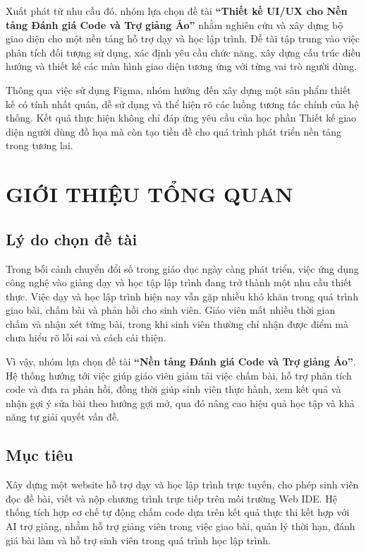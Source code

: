 \documentclass[12pt,a4paper,oneside]{report}
\begin{document}
Xuất phát từ nhu cầu đó, nhóm lựa chọn đề tài \textbf{``Thiết kế UI/UX cho Nền tảng Đánh giá Code và Trợ giảng Ảo''} nhằm nghiên cứu và xây dựng bộ giao diện cho một nền tảng hỗ trợ dạy và học lập trình. Đề tài tập trung vào việc phân tích đối tượng sử dụng, xác định yêu cầu chức năng, xây dựng cấu trúc điều hướng và thiết kế các màn hình giao diện tương ứng với từng vai trò người dùng.

Thông qua việc sử dụng Figma, nhóm hướng đến xây dựng một sản phẩm thiết kế có tính nhất quán, dễ sử dụng và thể hiện rõ các luồng tương tác chính của hệ thống. Kết quả thực hiện không chỉ đáp ứng yêu cầu của học phần Thiết kế giao diện người dùng đồ họa mà còn tạo tiền đề cho quá trình phát triển nền tảng trong tương lai.

\newpage

\chapter{GIỚI THIỆU TỔNG QUAN}

\section{Lý do chọn đề tài}

Trong bối cảnh chuyển đổi số trong giáo dục ngày càng phát triển, việc ứng dụng công nghệ vào giảng dạy và học tập lập trình đang trở thành một nhu cầu thiết thực. Việc dạy và học lập trình hiện nay vẫn gặp nhiều khó khăn trong quá trình giao bài, chấm bài và phản hồi cho sinh viên. Giáo viên mất nhiều thời gian chấm và nhận xét từng bài, trong khi sinh viên thường chỉ nhận được điểm mà chưa hiểu rõ lỗi sai và cách cải thiện. 

Vì vậy, nhóm lựa chọn đề tài \textbf{``Nền tảng Đánh giá Code và Trợ giảng Ảo''}. Hệ thống hướng tới việc giúp giáo viên giảm tải việc chấm bài, hỗ trợ phân tích code và đưa ra phản hồi, đồng thời giúp sinh viên thực hành, xem kết quả và nhận gợi ý sửa bài theo hướng gợi mở, qua đó nâng cao hiệu quả học tập và khả năng tự giải quyết vấn đề.

\section{Mục tiêu}

Xây dựng một website hỗ trợ dạy và học lập trình trực tuyến, cho phép sinh viên đọc đề bài, viết và nộp chương trình trực tiếp trên môi trường Web IDE. Hệ thống tích hợp cơ chế tự động chấm code dựa trên kết quả thực thi kết hợp với AI trợ giảng, nhằm hỗ trợ giảng viên trong việc giao bài, quản lý thời hạn, đánh giá bài làm và hỗ trợ sinh viên trong quá trình học lập trình. 
\end{document}
